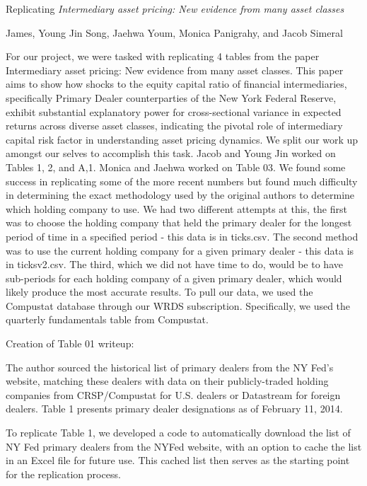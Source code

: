 \documentclass{article}
\begin{document}
{
\fontsize{12}{14}\selectfont
\textnormal{Replicating} \textit{Intermediary asset pricing: New evidence from many asset classes}
}

\bigskip

{
\fontsize{10}{12}\selectfont
James, Young Jin Song, Jaehwa Youm, Monica Panigrahy, and Jacob Simeral
}

For our project, we were tasked with replicating 4 tables from the paper Intermediary asset pricing: New evidence from many asset classes. This paper aims to show how shocks to the equity capital ratio of financial intermediaries, specifically Primary Dealer counterparties of the New York Federal Reserve, exhibit substantial explanatory power for cross-sectional variance in expected returns across diverse asset classes, indicating the pivotal role of intermediary capital risk factor in understanding asset pricing dynamics. We split our work up amongst our selves to accomplish this task. Jacob and Young Jin worked on Tables 1, 2, and A,1. Monica and Jaehwa worked on Table 03.
We found some success in replicating some of the more recent numbers but found much difficulty in determining the exact methodology used by the original authors to determine which holding company to use. We had two different attempts at this, the first was to choose the holding company that held the primary dealer for the longest period of time in a specified period - this data is in ticks.csv. The second method was to use the current holding company for a given primary dealer - this data is in ticksv2.csv. The third, which we did not have time to do, would be to have sub-periods for each holding company of a given primary dealer, which would likely produce the most accurate results.
To pull our data, we used the Compustat database through our WRDS subscription. Specifically, we used the quarterly fundamentals table from Compustat.

\clearpage
Creation of Table 01 writeup:

The author sourced the historical list of primary dealers from the NY Fed's website, matching these dealers with data on their publicly-traded holding companies from CRSP/Compustat for U.S. dealers or Datastream for foreign dealers. Table 1 presents primary dealer designations as of February 11, 2014.

To replicate Table 1, we developed a code to automatically download the list of NY Fed primary dealers from the NYFed website, with an option to cache the list in an Excel file for future use. This cached list then serves as the starting point for the replication process.
\end{document}
